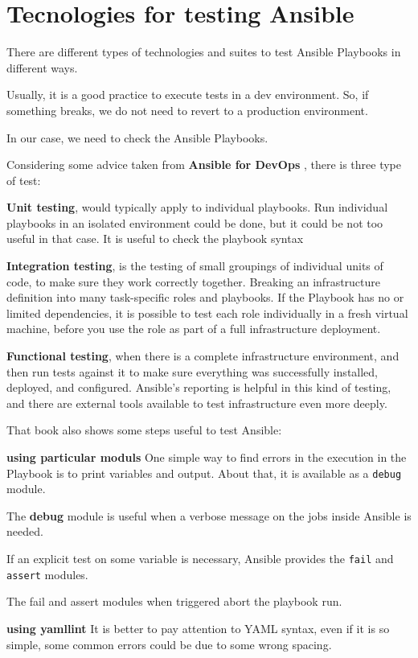 \documentclass[12pt,a4paper,openright,twoside]{book}
\begin{document}
\section{Tecnologies for testing Ansible}
There are different types of technologies and suites to test Ansible Playbooks in different ways.


Usually, it is a good practice to execute tests in a dev environment. So, if something breaks, we do not need to revert to a production environment.


In our case, we need to check the Ansible Playbooks.

Considering some advice taken from \textbf{Ansible for DevOps} \cite{ansibleForDevOps}, there is three type of test:

\textbf{Unit testing}, would typically apply to individual playbooks.
Run individual playbooks in an isolated environment could be done, but it could be not too useful in that case. It is useful to check the playbook syntax

\textbf{Integration testing}, is the testing of small groupings of individual units of code, to make sure they work correctly together.
Breaking an infrastructure definition into many task-specific roles and playbooks. If the Playbook has no or limited dependencies, it is possible to test each role individually in a fresh virtual machine, before you use the role as part of a full infrastructure deployment.

\textbf{Functional testing}, when there is a complete infrastructure environment, and then run tests against it to make sure everything was successfully installed, deployed, and configured. Ansible's reporting is helpful in this kind of testing, and there are external tools available to test infrastructure even more deeply.

That book also shows some steps useful to test Ansible:

\textbf{using particular moduls}
One simple way to find errors in the execution in the Playbook is to print variables and output. About that, it is available as a \texttt{debug} module.


The \textbf{debug} module is useful when a verbose message on the jobs inside Ansible is needed.


If an explicit test on some variable is necessary, Ansible provides the \texttt{fail} and \texttt{assert} modules.


The fail and assert modules when triggered abort the playbook run.

\textbf{using yamllint}
It is better to pay attention to YAML syntax, even if it is so simple, some common errors could be due to some wrong spacing.
\end{document}
